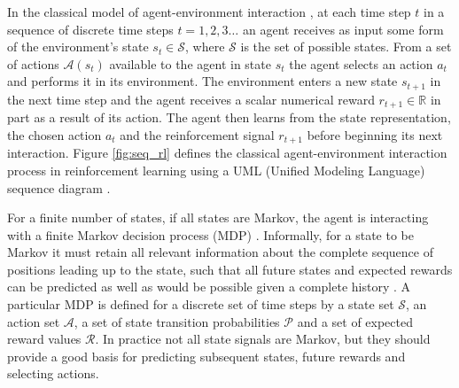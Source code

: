 In the classical model of agent-environment interaction \cite{suttonbarto:1998},
at each time step $t$ in a sequence of discrete time steps $t = 1,2,3\dotsc$ an
agent receives as input some form of the environment's state $s_t \in
\mathscr{S}$, where $\mathscr{S}$ is the set of possible states.  From a set of
actions $\mathscr{A}(s_t)$ available to the agent in state $s_t$ the agent
selects an action $a_t$ and performs it in its environment.  The environment
enters a new state $s_{t+1}$ in the next time step and the agent receives a
scalar numerical reward $r_{t+1} \in \mathbb{R}$ in part as a result of its
action. The agent then learns from the state representation, the chosen action
$a_t$ and the reinforcement signal $r_{t+1}$ before beginning its next
interaction.  Figure \ref{fig:seq_rl} defines the classical agent-environment
interaction process in reinforcement learning using a UML (Unified Modeling
Language) sequence diagram \cite{alhir:1998}.


For a finite number of states, if all states are Markov, the agent is
interacting with a finite Markov decision process (MDP)
\cite{howard:1964,aima:2003}. Informally, for a state to be Markov it must
retain all relevant information about the complete sequence of positions leading
up to the state, such that all future states and expected rewards can be
predicted as well as would be possible given a complete history
\cite{suttonbarto:1998}.  A particular MDP is defined for a discrete set of time
steps by a state set $\mathscr{S}$, an action set $\mathscr{A}$, a set of state
transition probabilities $\mathscr{P}$ and a set of expected reward values
$\mathscr{R}$.
In practice not all state signals are Markov, but they should provide a good
basis for predicting subsequent states, future rewards and selecting actions.

